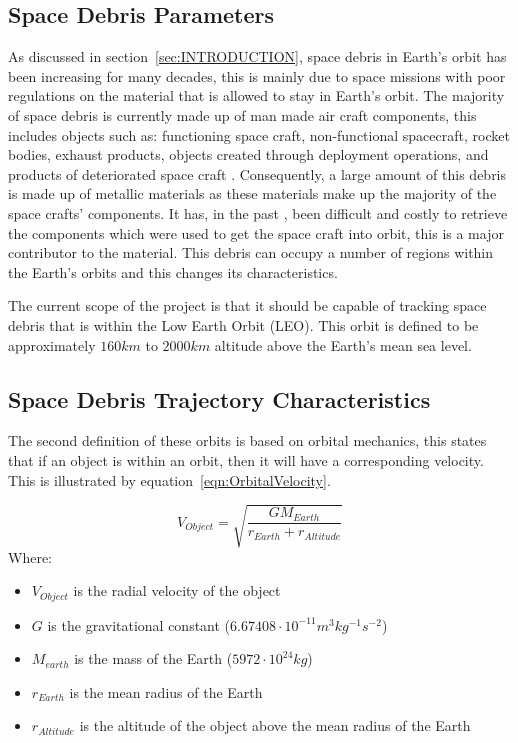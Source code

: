 \documentclass[11pt]{witseiepaper}
\begin{document}
\begin{bibunit}[witseie]
\section{Space Debris Parameters} \label{sec:SpaceDebrisParameters}
As discussed in section~\ref{sec:INTRODUCTION}, space debris in Earth's orbit has been increasing for many decades, this is mainly due to space missions with poor regulations on the material that is allowed to stay in Earth's orbit.
The majority of space debris is currently made up of man made air craft components, this includes objects such as: functioning space craft, non-functional spacecraft, rocket bodies, exhaust products, objects created through deployment operations, and products of deteriorated space craft \cite{OrbitalDebrisTechnicalAssessment}.
Consequently, a large amount of this debris is made up of metallic materials as these materials make up the majority of the space crafts' components.
It has, in the past \cite{Spacex}, been difficult and costly to retrieve the components which were used to get the space craft into orbit, this is a major contributor to the material.
This debris can occupy a number of regions within the Earth's orbits and this changes its characteristics.

The current scope of the project is that it should be capable of tracking space debris that is within the Low Earth Orbit (LEO). This orbit is defined to be approximately $160 km$ to $2000 km$ altitude above the Earth's mean sea level.


\subsection{Space Debris Trajectory Characteristics} \label{sec:SpaceDebrisTrajectoryCharacteristics}
The second definition of these orbits is based on orbital mechanics, this states that if an object is within an orbit, then it will have a corresponding velocity.
This is illustrated by equation~\ref{eqn:OrbitalVelocity}. 

\begin{equation} \label{eqn:OrbitalVelocity}
    V_{Object} = \sqrt{\frac{G M_{Earth}}{r_{Earth} + r_{Altitude}}}
\end{equation}
Where:
\begin{itemize}
    \item $V_{Object}$ is the radial velocity of the object
    \item $G$ is the gravitational constant ($6.67408 \cdot 10^{-11} m^3 kg^{-1} s^{-2}$)
    \item $M_{earth}$ is the mass of the Earth ($5972 \cdot 10^{24} kg$)
    \item $r_{Earth}$ is the mean radius of the Earth
    \item $r_{Altitude}$ is the altitude of the object above the mean radius of the Earth
\end{itemize}


\end{bibunit}
\end{document}
